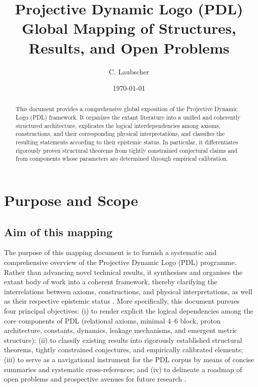 \documentclass{article}
\title{Projective Dynamic Logo (PDL)\\
Global Mapping of Structures, Results, and Open Problems}
\author{C. Laubscher}
\date{\today}
\begin{document}
\setcounter{tocdepth}{1}

\maketitle

\begin{abstract}
This document provides a comprehensive global exposition of the Projective Dynamic Logo (PDL) framework. It organizes the extant literature into a unified and coherently structured architecture, explicates the logical interdependencies among axioms, constructions, and their corresponding physical interpretations, and classifies the resulting statements according to their epistemic status. In particular, it differentiates rigorously proven structural theorems from tightly constrained conjectural claims and from components whose parameters are determined through empirical calibration.\end{abstract}
\tableofcontents

\section{Purpose and Scope}
\label{sec:purpose_scope}

\subsection{Aim of this mapping}
\label{subsec:aim}

The purpose of this mapping document is to furnish a systematic and comprehensive overview of the Projective Dynamic Logo (PDL) programme. Rather than advancing novel technical results, it synthesises and organises the extant body of work into a coherent framework, thereby clarifying the interrelations between axioms, constructions, and physical interpretations, as well as their respective epistemic status \cite{PDL_position,PDL_intro}. More specifically, this document pursues four principal objectives: (i) to render explicit the logical dependencies among the core components of PDL (relational axioms, minimal $4$--$6$ block, proton architecture, constants, dynamics, leakage mechanisms, and emergent metric structure); (ii) to classify existing results into rigorously established structural theorems, tightly constrained conjectures, and empirically calibrated elements; (iii) to serve as a navigational instrument for the PDL corpus by means of concise summaries and systematic cross-references; and (iv) to delineate a roadmap of open problems and prospective avenues for future research \cite{PDL_position}.
\end{document}
